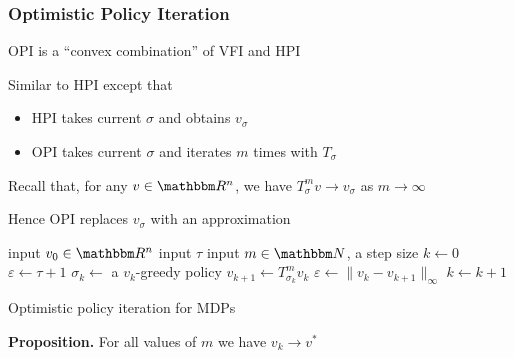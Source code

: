 \documentclass[xcolor=dvipsnames]{beamer}
\newcommand{\RR}{\mathbbm R}
\newcommand{\NN}{\mathbbm N}
\renewcommand{\epsilon}{\varepsilon}
\newcommand{\1}{\mathbbm 1}
\begin{document}
\begin{frame}
    \frametitle{Optimistic Policy Iteration}

    OPI is a ``convex combination'' of VFI and HPI

    \vspace{0.5em}
    Similar to HPI except that
    \begin{itemize}
        \item HPI takes current $\sigma$ and obtains $v_\sigma$
    \vspace{0.5em}
        \item OPI takes current $\sigma$ and iterates $m$ times with $T_{\sigma}$
    \end{itemize}


    \vspace{0.5em}
    Recall that, for any $v \in \RR^n$, we have $T^m_{\sigma} v \to v_\sigma$ as $m \to \infty$

    \vspace{0.5em}
    \vspace{0.5em}
    Hence OPI replaces $v_\sigma$ with an approximation

\end{frame}


\begin{frame}
    
    {\small
    \begin{algorithm}[H]
        \DontPrintSemicolon
        input $v_0 \in \RR^n$\;
        input $\tau$\;
        input $m \in \NN$, a step size \;
        $k \leftarrow 0$ \;
        $\epsilon \leftarrow \tau + 1$ \;
        \While{$\epsilon > \tau $}
        {
            $\sigma_k \leftarrow $ a $v_k$-greedy policy \;
            $v_{k+1} \leftarrow T_{\sigma_k}^m v_k$  \;
            $\epsilon \leftarrow \| v_k - v_{k+1} \|_\infty$ \;
            $k \leftarrow k + 1$ \;
        }
        \caption{Optimistic policy iteration for MDPs}
    \end{algorithm}
    }

\end{frame}


\begin{frame}

    \vspace{0.5em}
    \vspace{0.5em}
    \begin{block}{}
        {\bf Proposition.} For all values of $m$ we have $v_k \to v^*$
    \end{block}


\end{frame}
\end{document}
